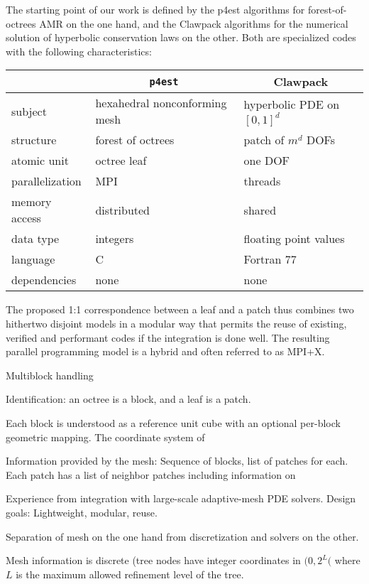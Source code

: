 \documentclass{IOS-Book-Article}     %
\begin{document}
The starting point of our work is defined by the p4est algorithms for
forest-of-octrees AMR on the one hand, and the Clawpack algorithms for the
numerical solution of hyperbolic conservation laws
on the other.  Both are specialized codes with the following characteristics:
\begin{center}
\begin{tabular}{l|l|l}
& \multicolumn{1}{c|}{\texttt{p4est}} & \multicolumn{1}{c}{Clawpack} \\
\hline
subject & hexahedral nonconforming mesh &  hyperbolic PDE on $[0, 1]^d$ \\
structure & forest of octrees & patch of $m^d$ DOFs \\
atomic unit & octree leaf & one DOF \\
parallelization & MPI & threads \\
memory access & distributed & shared \\
data type & integers & floating point values \\
language & C & Fortran 77 \\
dependencies & none & none \\
\hline
\end{tabular}
\end{center}
The proposed 1:1 correspondence between a leaf and a patch thus combines two
hithertwo disjoint models in a modular way that permits the reuse of existing,
verified and performant codes if the integration is done well.  The resulting
parallel programming model is a hybrid and often referred to as MPI+X.

Multiblock handling

Identification: an octree is a block, and a leaf is a patch.

Each block is understood as a reference unit cube with an optional per-block
geometric mapping.  The coordinate system of 


Information provided by the mesh:
Sequence of blocks, list of patches for each.  Each patch
has a list of neighbor patches including information on 



Experience from integration with large-scale adaptive-mesh PDE solvers.
Design goals: Lightweight, modular, reuse.

Separation of mesh on the one hand from discretization and solvers on the other.

Mesh information is discrete (tree nodes have integer coordinates in
$(0, 2^L($ where $L$ is the maximum allowed refinement level of the tree.
\end{document}
